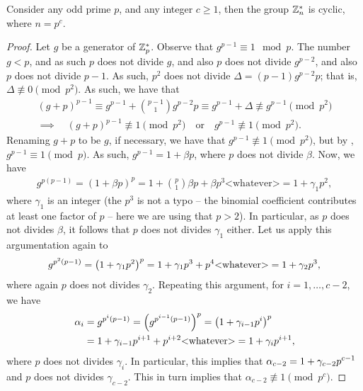 \begin{lemma}
    Consider any odd prime $p$, and any integer $c \geq 1$, then the
    group $\mathbb{Z}_n^*$ is cyclic, where $n=p^c$.
\end{lemma}
\begin{proof}
    Let $g$ be a generator of $\mathbb{Z}_p^*$. Observe that $g^{p-1} \equiv
    1 \mod p$. The number $g <p$, and as such $p$ does not divide $g$,
    and also $p$ does not divide $g^{p-2}$, and also $p$ does not
    divide $p-1$. As such, $p^2$ does not divide $\Delta =
    (p-1)g^{p-2}p$; that is, $\Delta \nequiv 0 \pmod{p^2}$. As such,
    we have that 
    \begin{align*}
        (g+p)^{p-1} \equiv g^{p-1} + \binom{p-1}{1} g^{p-2} p \equiv
        g^{p-1} + \Delta \nequiv g^{p-1} \pmod{p^2}\\
        \implies\quad%
        (g+p)^{p-1} \nequiv 1 \pmod{p^2}%
        \quad \text{or}\quad%
        g^{p-1} \nequiv 1 \pmod{p^2}.
    \end{align*}
    Renaming $g+p$ to be $g$, if necessary, we have that %
    $g^{p-1} \nequiv 1 \pmod{p^2}$, but by ,
    $g^{p-1} \equiv 1 \pmod{p}$. As such, $g^{p-1} = 1 +\beta p$,
    where $p$ does not divide $\beta$. Now, we have 
    \begin{align*}
        g^{p(p-1)} = (1+\beta p)^p = 1 + \binom{p}{1} \beta p + \beta
        p^3 \text{<whatever>}%
        =%
        1 + \gamma_1 p^2,
    \end{align*}
    where $\gamma_1$ is an integer (the $p^3$ is not a typo -- the
    binomial coefficient contributes at least one factor of $p$ --
    here we are using that $p >2$). In particular, as $p$ does not
    divides $\beta$, it follows that $p$ does not divides $\gamma_1$
    either. Let us apply this argumentation again to 
    \begin{align*}
        g^{p^2(p-1)}%
        =%
        \pth[]{1+\gamma_1 p^2}^p = 1 +\gamma_1 p^3 + p^4
        \text{<whatever>}%
        =%
        1 + \gamma_2 p^3,
    \end{align*}
    where again $p$ does not divides $\gamma_2$. Repeating this
    argument, for $i=1,\ldots, c-2$, we have
    \begin{align*}
        \alpha_i%
        &=%
        g^{p^i(p-1)}%
        =%
        \pth[]{g^{p^{i-1}(p-1)}}^p%
        =%
        \pth[]{1+\gamma_{i-1} p^{i}}^p\\
        &=%
        1 + \gamma_{i-1} p^{i+1} + p^{i+2} \text{<whatever>}%
        =%
        1 + \gamma_i p^{i+1},
    \end{align*}
    where $p$ does not divides $\gamma_i$. In particular, this implies
    that 
    \begin{math}
        \ds%
        \alpha_{c-2} =%
        1 + \gamma_{c-2} p^{c-1}
    \end{math}
    and $p$ does not divides $\gamma_{c-2}$. This in turn implies that
    $\alpha_{c-2} \nequiv 1 \pmod{p^{c}}$. 


\end{proof}
